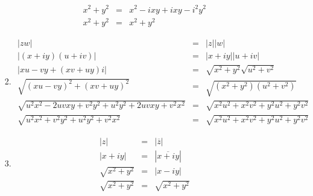 \documentclass{article}%
\newcommand\abs[1]{\left|#1\right|}
\begin{document}
\begin{enumerate}
\begin{enumerate}[label*=\arabic*.]
\begin{enumerate}[label=\alph*]
\begin{eqnarray*}
            x^2+y^2&=&x^2-ixy+ixy-i^2y^2 \\
            x^2+y^2&=&x^2+y^2
        \end{eqnarray*}
        \item \begin{eqnarray*}
            \abs{zw}&=&\abs{z}\abs{w} \\
            \abs{(x+iy)(u+iv)}&=&\abs{x+iy}\abs{u+iv} \\
            \abs{xu-vy+(xv+uy)i}&=&\sqrt{x^2+y^2}\sqrt{u^2+v^2} \\
            \sqrt{(xu-vy)^2+(xv+uy)^2}&=&\sqrt{(x^2+y^2)(u^2+v^2)} \\
            \sqrt{u^2x^2-2uvxy+v^2y^2+u^2y^2+2uvxy+v^2x^2}&=&\sqrt{x^2u^2+x^2v^2+y^2u^2+y^2v^2} \\
            \sqrt{u^2x^2+v^2y^2+u^2y^2+v^2x^2}&=&\sqrt{x^2u^2+x^2v^2+y^2u^2+y^2v^2}
        \end{eqnarray*}
        \item \begin{eqnarray*}
            \abs{z}&=&\abs{\overline{z}} \\
            \abs{x+iy}&=&\abs{\overline{x+iy}} \\
            \sqrt{x^2+y^2}&=&\abs{x-iy} \\
            \sqrt{x^2+y^2}&=&\sqrt{x^2+y^2}
        \end{eqnarray*}
    \end{enumerate}
  \end{enumerate}
\end{enumerate}
\end{document}
